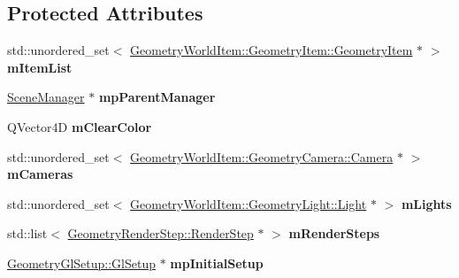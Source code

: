 \subsection*{Protected Attributes}
\begin{DoxyCompactItemize}
\item 
\mbox{\label{class_geometry_engine_1_1_geometry_scene_1_1_geometry_scene_a257bfac1c86d4f4aa5a2fa30032e81f9}} 
std\+::unordered\+\_\+set$<$ \mbox{\hyperlink{class_geometry_engine_1_1_geometry_world_item_1_1_geometry_item_1_1_geometry_item}{Geometry\+World\+Item\+::\+Geometry\+Item\+::\+Geometry\+Item}} $\ast$ $>$ {\bfseries m\+Item\+List}
\item 
\mbox{\label{class_geometry_engine_1_1_geometry_scene_1_1_geometry_scene_a19decf3fc42881a74b9116f4371e67e9}} 
\mbox{\hyperlink{class_geometry_engine_1_1_scene_manager}{Scene\+Manager}} $\ast$ {\bfseries mp\+Parent\+Manager}
\item 
\mbox{\label{class_geometry_engine_1_1_geometry_scene_1_1_geometry_scene_a1a819d7143438d588027379bf90659df}} 
Q\+Vector4D {\bfseries m\+Clear\+Color}
\item 
\mbox{\label{class_geometry_engine_1_1_geometry_scene_1_1_geometry_scene_a333da924badacb417e7f5ff3f34ff458}} 
std\+::unordered\+\_\+set$<$ \mbox{\hyperlink{class_geometry_engine_1_1_geometry_world_item_1_1_geometry_camera_1_1_camera}{Geometry\+World\+Item\+::\+Geometry\+Camera\+::\+Camera}} $\ast$ $>$ {\bfseries m\+Cameras}
\item 
\mbox{\label{class_geometry_engine_1_1_geometry_scene_1_1_geometry_scene_a52e1c085d3453010ed213ef7b5193a0c}} 
std\+::unordered\+\_\+set$<$ \mbox{\hyperlink{class_geometry_engine_1_1_geometry_world_item_1_1_geometry_light_1_1_light}{Geometry\+World\+Item\+::\+Geometry\+Light\+::\+Light}} $\ast$ $>$ {\bfseries m\+Lights}
\item 
\mbox{\label{class_geometry_engine_1_1_geometry_scene_1_1_geometry_scene_a428c870acededf889494acaa6db3a19a}} 
std\+::list$<$ \mbox{\hyperlink{class_geometry_engine_1_1_geometry_render_step_1_1_render_step}{Geometry\+Render\+Step\+::\+Render\+Step}} $\ast$ $>$ {\bfseries m\+Render\+Steps}
\item 
\mbox{\label{class_geometry_engine_1_1_geometry_scene_1_1_geometry_scene_a2b0f10328f1e4b79e12bf8d1fe6b34b0}} 
\mbox{\hyperlink{class_geometry_engine_1_1_geometry_gl_setup_1_1_gl_setup}{Geometry\+Gl\+Setup\+::\+Gl\+Setup}} $\ast$ {\bfseries mp\+Initial\+Setup}
\end{DoxyCompactItemize}



